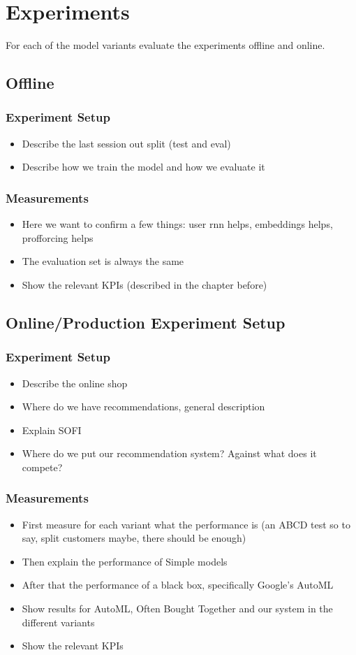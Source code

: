 \chapter{Experiments}
For each of the model variants evaluate the experiments offline and online.
\section{Offline}
\subsection{Experiment Setup}
\begin{itemize}
    \item Describe the last session out split (test and eval)
    \item Describe how we train the model and how we evaluate it
\end{itemize}
\subsection{Measurements}
\begin{itemize}
    \item Here we want to confirm a few things: user rnn helps, embeddings helps, profforcing helps
    \item The evaluation set is always the same
    \item Show the relevant KPIs (described in the chapter before)
\end{itemize}

\section{Online/Production Experiment Setup}
\subsection{Experiment Setup}
\begin{itemize}
    \item Describe the online shop
    \item Where do we have recommendations, general description
    \item Explain SOFI
    \item Where do we put our recommendation system? Against what does it compete?
\end{itemize}
\subsection{Measurements}
\begin{itemize}
    \item First measure for each variant what the performance is (an ABCD test so to say, split customers maybe, there should be enough)
    \item Then explain the performance of Simple models
    \item After that the performance of a black box, specifically Google's AutoML
    \item Show results for AutoML, Often Bought Together and our system in the different variants
    \item Show the relevant KPIs
\end{itemize}